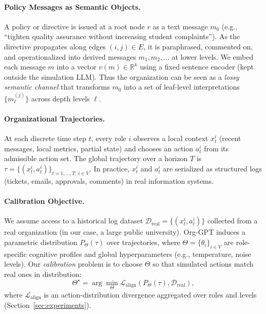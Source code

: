 \documentclass{article}
\begin{document}
\paragraph{Policy Messages as Semantic Objects.}
A policy or directive is issued at a root node $r$ as a text message $m_0$ (e.g., “tighten quality assurance without increasing student complaints”).
As the directive propagates along edges $(i,j) \in E$, it is paraphrased, commented on, and operationalized into derived messages $m_1, m_2, \dots$ at lower levels.
We embed each message $m$ into a vector $v(m) \in \mathbb{R}^k$ using a fixed sentence encoder (kept outside the simulation LLM).
Thus the organization can be seen as a \emph{lossy semantic channel} that transforms $m_0$ into a set of leaf-level interpretations $\{m_{\ell}^{(j)}\}$ across depth levels $\ell$.

\paragraph{Organizational Trajectories.}
At each discrete time step $t$, every role $i$ observes a local context $x_t^i$ (recent messages, local metrics, partial state) and chooses an action $a_t^i$ from its admissible action set.
The global trajectory over a horizon $T$ is
$\tau = \{(x_t^i, a_t^i)\}_{t=1,\dots,T;\, i \in V}$.
In practice, $x_t^i$ and $a_t^i$ are serialized as structured logs (tickets, emails, approvals, comments) in real information systems.

\paragraph{Calibration Objective.}
We assume access to a historical log dataset
$\mathcal{D}_{\text{real}} = \{(x_t^i, a_t^i)\}$ collected from a real organization (in our case, a large public university).
Org-GPT induces a parametric distribution
$P_{\Theta}(\tau)$ over trajectories, where
$\Theta = \{\theta_i\}_{i \in V}$ are role-specific cognitive profiles and global hyperparameters (e.g., temperature, noise levels).
Our \emph{calibration} problem is to choose $\Theta$ so that simulated actions match real ones in distribution:
\begin{equation}
    \Theta^\star
    = \arg\min_{\Theta}
    \mathcal{L}_{\text{align}}(P_{\Theta}(\tau), \mathcal{D}_{\text{real}}),
\end{equation}
where $\mathcal{L}_{\text{align}}$ is an action-distribution divergence aggregated over roles and levels (Section~\ref{sec:experiments}).
\end{document}
